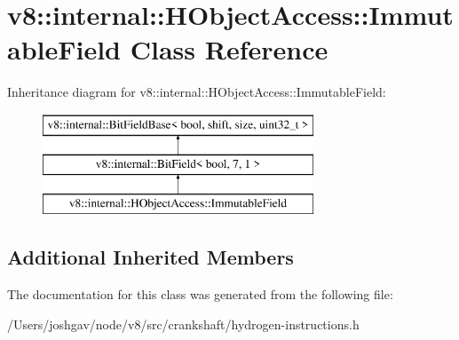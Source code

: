 \hypertarget{classv8_1_1internal_1_1_h_object_access_1_1_immutable_field}{}\section{v8\+:\+:internal\+:\+:H\+Object\+Access\+:\+:Immutable\+Field Class Reference}
\label{classv8_1_1internal_1_1_h_object_access_1_1_immutable_field}
Inheritance diagram for v8\+:\+:internal\+:\+:H\+Object\+Access\+:\+:Immutable\+Field\+:\begin{figure}[H]
\begin{center}
\leavevmode
\includegraphics[height=3.000000cm]{classv8_1_1internal_1_1_h_object_access_1_1_immutable_field}
\end{center}
\end{figure}
\subsection*{Additional Inherited Members}


The documentation for this class was generated from the following file\+:\begin{DoxyCompactItemize}
\item 
/\+Users/joshgav/node/v8/src/crankshaft/hydrogen-\/instructions.\+h\end{DoxyCompactItemize}
